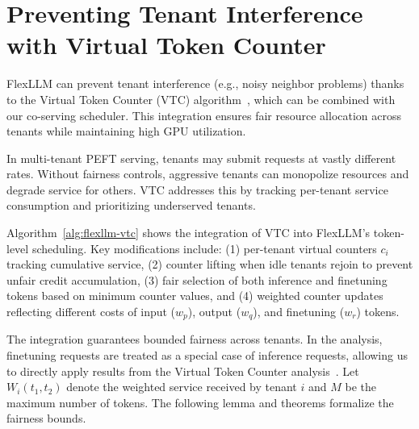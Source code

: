 \begin{table}[H]
\centering
\caption{Percentage of requests experiencing an eviction}
\label{tab:coserving_evictions}
\end{table}

\section{Preventing Tenant Interference with Virtual Token Counter}
\label{sec:vtc-integration}

FlexLLM can prevent tenant interference (e.g., noisy neighbor problems) thanks to the Virtual Token Counter (VTC) algorithm~\cite{sheng2024fairness}, which can be combined with our co-serving scheduler. This integration ensures fair resource allocation across tenants while maintaining high GPU utilization.

In multi-tenant PEFT serving, tenants may submit requests at vastly different rates. Without fairness controls, aggressive tenants can monopolize resources and degrade service for others. VTC addresses this by tracking per-tenant service consumption and prioritizing underserved tenants.

Algorithm~\ref{alg:flexllm-vtc} shows the integration of VTC into FlexLLM's token-level scheduling. Key modifications include: (1) per-tenant virtual counters $c_i$ tracking cumulative service, (2) counter lifting when idle tenants rejoin to prevent unfair credit accumulation, (3) fair selection of both inference and finetuning tokens based on minimum counter values, and (4) weighted counter updates reflecting different costs of input ($w_p$), output ($w_q$), and finetuning ($w_r$) tokens.

The integration guarantees bounded fairness across tenants. In the analysis, finetuning requests are treated as a special case of inference requests, allowing us to directly apply results from the Virtual Token Counter analysis~\cite{sheng2024fairness}. Let $W_i(t_1, t_2)$ denote the weighted service received by tenant $i$ and $M$ be the maximum number of tokens. The following lemma and theorems formalize the fairness bounds.

